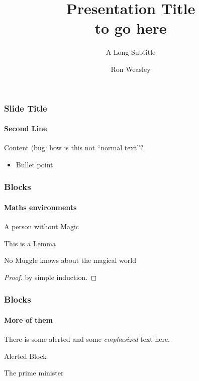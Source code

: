 \documentclass[aspectratio=169]{beamer}
\title{Presentation Title\\to go here}
\subtitle{A Long Subtitle}
\author{Ron Weasley}
\institute[Computer Science]{Liverpool}
\begin{document}
\begin{frame}
\maketitle
\end{frame}

\begin{frame}[t]
    \frametitle{Slide Title}
    \framesubtitle{Second Line}

    Content (bug: how is this not ``normal text''?
    \begin{itemize}
        \item Bullet point
    \end{itemize}
\end{frame}


 
\begin{frame}
\frametitle{Blocks}
\framesubtitle{Maths environments}

\begin{definition}[Muggle]
A person without Magic
\end{definition}

\begin{lemma}
    This is a Lemma
\end{lemma}
\begin{theorem}
No Muggle knows about the magical world
\end{theorem} 
\begin{proof}
    by simple induction.
\end{proof}


\end{frame}
\begin{frame}
\frametitle{Blocks}
\framesubtitle{More of them}

There is some \alert{alerted} and some \emph{emphasized} text here.

\begin{alertblock}{Alerted Block}
    \lipsum[1][1-2] 
\end{alertblock}
\begin{example}[Muggle]
The prime minister
\end{example}

\end{frame}
\end{document}
